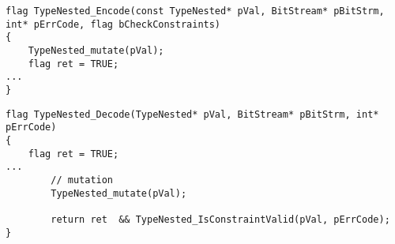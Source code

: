 \begin{minipage}{14cm}
\begin{lstlisting}[style=CStyle, caption=Example of data-driven mutation probe for ASN.1 that has been added to the encoding function., label=ASN_encode]
flag TypeNested_Encode(const TypeNested* pVal, BitStream* pBitStrm, int* pErrCode, flag bCheckConstraints)
{
    TypeNested_mutate(pVal);
    flag ret = TRUE;
...
}
\end{lstlisting}
\end{minipage}

\begin{minipage}{14cm}
\begin{lstlisting}[style=CStyle, caption=Example of data-driven mutation probe for ASN.1 that has been added to the decoding function., label=ASN_decode]
flag TypeNested_Decode(TypeNested* pVal, BitStream* pBitStrm, int* pErrCode)
{
    flag ret = TRUE;
...
        // mutation
        TypeNested_mutate(pVal);

        return ret  && TypeNested_IsConstraintValid(pVal, pErrCode);
}
\end{lstlisting}
\end{minipage}

%
%
%
